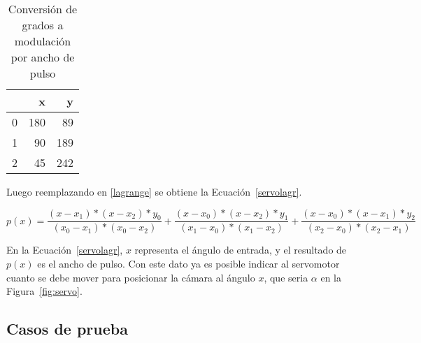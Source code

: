 \begin{table}
\centering
\begin{tabular}{| r | r | r |}
\hline
  & \textbf{x} & \textbf{y} \\
\hline
0 & 180 & 89 \\ 
\hline
1 &  90 & 189 \\
\hline
2 &  45 & 242 \\
\hline
\end{tabular}
\caption{Conversión de grados a modulación por ancho de pulso}
\label{table:puntosg2pwm}
\end{table}

Luego reemplazando en \ref{lagrange} se obtiene la Ecuación~\ref{servolagr}.


\begin{equation}
p(x) = \frac{(x - x_1) * (x - x_2) * y_0}{(x_0 - x_1) * (x_0 - x_2)} + \frac{(x - x_0) * (x - x_2) * y_1}{(x_1 - x_0) * (x_1 - x_2)} + \frac{(x - x_0) * (x - x_1) * y_2}{(x_2 - x_0) * (x_2 - x_1)} \label{servolagr} 
\end{equation}

En la Ecuación~\ref{servolagr}, $x$ representa el ángulo de entrada, y el resultado de $p(x)$ es el ancho de pulso. Con este dato ya es posible indicar al servomotor cuanto se debe mover para posicionar la cámara al ángulo $x$, que seria $\alpha$ en la Figura~\ref{fig:servo}.

\subsection{Casos de prueba}


